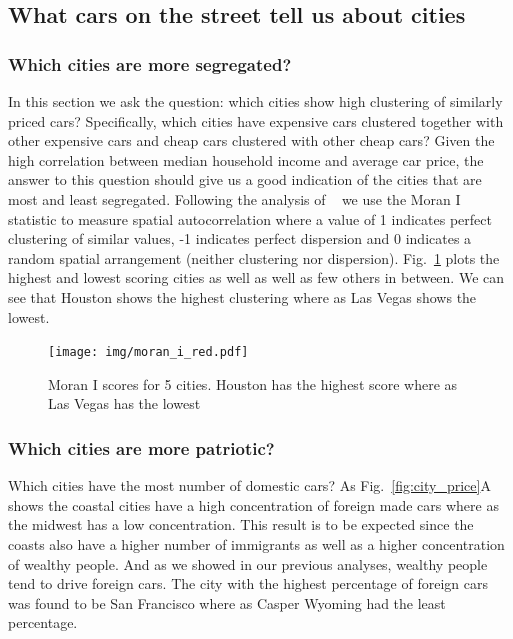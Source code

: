 \documentclass[10pt,twocolumn,letterpaper]{article}
\begin{document}
\subsection{What cars on the street tell us about cities}
\subsubsection{Which cities are more segregated?}
In this section we ask the question: which cities show high clustering of similarly priced cars? Specifically, which cities have expensive cars clustered together with other expensive cars and cheap cars clustered with other cheap cars? Given the high correlation between median household income and average car price, the answer to this question should give us a good indication of the cities that are most and least segregated. Following the analysis of ~\cite{mit_plos_1} we use the Moran I statistic to measure spatial autocorrelation where a value of 1 indicates perfect clustering of similar values, -1 indicates perfect dispersion and 0 indicates a random spatial arrangement (neither clustering nor dispersion). Fig.~\ref{fig:moran-i} plots the highest and lowest scoring cities as well as well as few others in between. We can see that Houston shows the highest clustering where as Las Vegas shows the lowest.

\begin{figure}[t]
\begin{center}
    \texttt{[image: img/moran\_i\_red.pdf]}
\end{center}
   \caption {Moran I scores for 5 cities. Houston has the highest score where as Las Vegas has the lowest}
\label{fig:moran-i}
\end{figure}

\subsubsection{Which cities are more patriotic?}
Which cities have the most number of domestic cars? As Fig.~\ref{fig:city_price}A shows the coastal cities have a high concentration of foreign made cars where as the midwest has a low concentration. This result is to be expected since the coasts also have a higher number of immigrants as well as a higher concentration of wealthy people. And as we showed in our previous analyses, wealthy people tend to drive foreign cars. The city with the highest percentage of foreign cars was found to be San Francisco where as Casper Wyoming had the least percentage.
\end{document}

